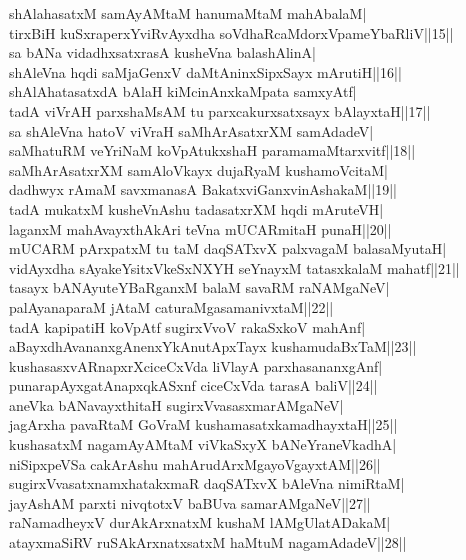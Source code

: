 \documentclass{article}
\begin{document}
shAlahasatxM samAyAMtaM hanumaMtaM mahAbalaM|\\
tirxBiH kuSxraperxYviRvAyxdha soVdhaRcaMdorxVpameYbaRliV||15||\\
sa bANa vidadhxsatxrasA kusheVna balashAlinA|\\
shAleVna hqdi saMjaGenxV daMtAninxSipxSayx mArutiH||16||\\
shAlAhatasatxdA bAlaH kiMcinAnxkaMpata samxyAtf|\\
tadA viVrAH parxshaMsAM tu parxcakurxsatxsayx bAlayxtaH||17||\\
sa shAleVna hatoV viVraH saMhArAsatxrXM samAdadeV|\\
saMhatuRM veYriNaM koVpAtukxshaH paramamaMtarxvitf||18||\\
saMhArAsatxrXM samAloVkayx dujaRyaM kushamoVcitaM|\\
dadhwyx rAmaM savxmanasA BakatxviGanxvinAshakaM||19||\\
tadA mukatxM kusheVnAshu tadasatxrXM hqdi mAruteVH|\\
laganxM mahAvayxthAkAri teVna mUCARmitaH punaH||20||\\
mUCARM pArxpatxM tu taM daqSATxvX palxvagaM balasaMyutaH|\\
vidAyxdha sAyakeYsitxVkeSxNXYH seYnayxM tatasxkalaM mahatf||21||\\
tasayx bANAyuteYBaRganxM balaM savaRM raNAMgaNeV|\\
palAyanaparaM jAtaM caturaMgasamanivxtaM||22||\\
tadA kapipatiH koVpAtf sugirxVvoV rakaSxkoV mahAnf|\\
aBayxdhAvananxgAnenxYkAnutApxTayx kushamudaBxTaM||23||\\
kushasasxvARnapxrXciceCxVda liVlayA parxhasananxgAnf|\\
punarapAyxgatAnapxqkASxnf ciceCxVda tarasA baliV||24||\\
aneVka bANavayxthitaH sugirxVvasasxmarAMgaNeV|\\
jagArxha pavaRtaM GoVraM kushamasatxkamadhayxtaH||25||\\
kushasatxM nagamAyAMtaM viVkaSxyX bANeYraneVkadhA|\\
niSipxpeVSa cakArAshu mahArudArxMgayoVgayxtAM||26||\\
sugirxVvasatxnamxhatakxmaR daqSATxvX bAleVna nimiRtaM|\\
jayAshAM parxti nivqtotxV baBUva samarAMgaNeV||27||\\
raNamadheyxV durAkArxnatxM kushaM lAMgUlatADakaM|\\
atayxmaSiRV ruSAkArxnatxsatxM haMtuM nagamAdadeV||28||\\
\end{document}
